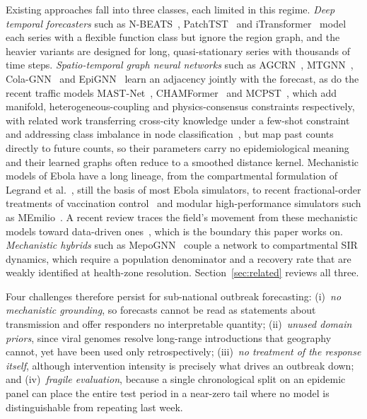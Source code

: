 \documentclass[conference]{IEEEtran}
\begin{document}
Existing approaches fall into three classes, each limited in this regime. \textit{Deep temporal forecasters} such as N-BEATS~\cite{nbeats}, PatchTST~\cite{patchtst} and iTransformer~\cite{itransformer} model each series with a flexible function class but ignore the region graph, and the heavier variants are designed for long, quasi-stationary series with thousands of time steps. \textit{Spatio-temporal graph neural networks} such as AGCRN~\cite{agcrn}, MTGNN~\cite{mtgnn}, Cola-GNN~\cite{colagnn} and EpiGNN~\cite{epignn} learn an adjacency jointly with the forecast, as do the recent traffic models MAST-Net~\cite{mastnet}, CHAMFormer~\cite{chamformer} and MCPST~\cite{mcpst}, which add manifold, heterogeneous-coupling and physics-consensus constraints respectively, with related work transferring cross-city knowledge under a few-shot constraint~\cite{xcity} and addressing class imbalance in node classification~\cite{cl3an}, but map past counts directly to future counts, so their parameters carry no epidemiological meaning and their learned graphs often reduce to a smoothed distance kernel. Mechanistic models of Ebola have a long lineage, from the compartmental formulation of Legrand et al.~\cite{legrand2007}, still the basis of most Ebola simulators, to recent fractional-order treatments of vaccination control~\cite{yunus2025} and modular high-performance simulators such as MEmilio~\cite{memilio2026}. A recent review traces the field's movement from these mechanistic models toward data-driven ones~\cite{sun2026}, which is the boundary this paper works on. \textit{Mechanistic hybrids} such as MepoGNN~\cite{mepognn} couple a network to compartmental SIR dynamics, which require a population denominator and a recovery rate that are weakly identified at health-zone resolution. Section~\ref{sec:related} reviews all three.

Four challenges therefore persist for sub-national outbreak forecasting: (i)~\textit{no mechanistic grounding}, so forecasts cannot be read as statements about transmission and offer responders no interpretable quantity; (ii)~\textit{unused domain priors}, since viral genomes resolve long-range introductions that geography cannot, yet have been used only retrospectively; (iii)~\textit{no treatment of the response itself}, although intervention intensity is precisely what drives an outbreak down; and (iv)~\textit{fragile evaluation}, because a single chronological split on an epidemic panel can place the entire test period in a near-zero tail where no model is distinguishable from repeating last week.
\end{document}
